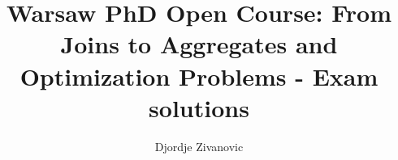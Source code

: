 \documentclass[10pt,a4paper]{article}
\author{Djordje Zivanovic}
\title{\textbf{Warsaw PhD Open Course: From Joins to Aggregates and
Optimization Problems - Exam solutions}}
\begin{document}
\maketitle
\bigskip
\newcommand{\transpose}[1]{#1 ^ \text{T}}
\newcommand{\mat}[1]{\textbf{\text{{#1}}}}
\newcommand{\vect}[1]{\mat{#1}}
\newcommand{\view}[3]{\delta R_*(a', b') \cdot V_{S_{#1}T_{#2}W_{#3}}(b', a')}
\newcommand{\gradient}[1]{\nabla_{\vect{#1}}}
\newcommand{\der}[1]{\frac{\partial}{\partial #1}}
\newcommand{\numberthis}{\addtocounter{equation}{1}\tag{\theequation}}
\newcommand{\logfun}{\sigma(\transpose{\vect{x}}_i \vect{w})}
\newcommand{\softmaxi}{\frac{e^{z_i}}{\sum_{l=1}^Ce^{z_l}}}
\newcommand{\layersep}{2.5cm}
\newcommand{\layersepH}{6cm}
\newcommand{\layersepP}{7cm}
\newcommand{\layersepB}{9cm}
\newtheorem{theorem}{Theorem}
\newtheorem{lemma}[theorem]{Lemma}
\end{document}
